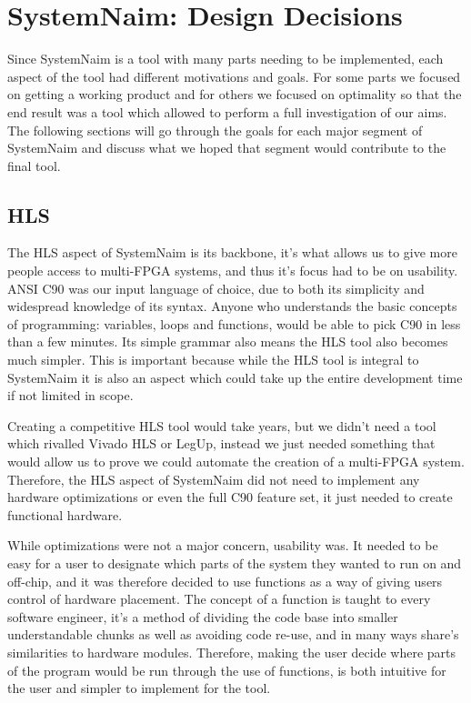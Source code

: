 \chapter{SystemNaim: Design Decisions}

Since SystemNaim is a tool with many parts needing to be implemented, each aspect of the tool had different motivations and goals. For some parts we focused on getting a working product and for others we focused on optimality so that the end result was a tool which allowed to perform a full investigation of our aims. The following sections will go through the goals for each major segment of SystemNaim and discuss what we hoped that segment would contribute to the final tool.

\section{HLS}
\label{sec:hls_design}

The HLS aspect of SystemNaim is its backbone, it's what allows us to give more people access to multi-FPGA systems, and thus it's focus had to be on usability. ANSI C90 was our input language of choice, due to both its simplicity and widespread knowledge of its syntax. Anyone who understands the basic concepts of programming: variables, loops and functions, would be able to pick C90 in less than a few minutes. Its simple grammar also means the HLS tool also becomes much simpler. This is important because while the HLS tool is integral to SystemNaim it is also an aspect which could take up the entire development time if not limited in scope. 

Creating a competitive HLS tool would take years, but we didn't need a tool which rivalled Vivado HLS or LegUp, instead we just needed something that would allow us to prove we could automate the creation of a multi-FPGA system. Therefore, the HLS aspect of SystemNaim did not need to implement any hardware optimizations or even the full C90 feature set, it just needed to create functional hardware.

While optimizations were not a major concern, usability was. It needed to be easy for a user to designate which parts of the system they wanted to run on and off-chip, and it was therefore decided to use functions as a way of giving users control of hardware placement. The concept of a function is taught to every software engineer, it's a method of dividing the code base into smaller understandable chunks as well as avoiding code re-use, and in many ways share's similarities to hardware modules. Therefore, making the user decide where parts of the program would be run through the use of functions, is both intuitive for the user and simpler to implement for the tool. 

